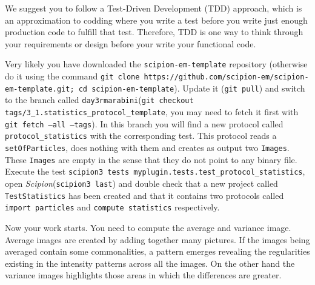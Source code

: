 \documentclass[12pt]{article} %
\def\scipion{\textit{Scipion}\xspace}
\newcommand{\ttt}[1]{\texttt{#1}}
\def\repository{\ttt{scipion-em-template}\xspace}
\def\branch{\ttt{day3rmarabini}\xspace}
\def\protocolname{\ttt{protocol\_statistics}\xspace}
\begin{document}
We suggest you to follow a Test-Driven Development (TDD) approach, which is an approximation to codding where you write a test before you write just enough production code to fulfill that test. Therefore, TDD is one way to think through your requirements or design before your write your functional code.

Very likely you have downloaded the \repository repository (otherwise do it using the command \ttt{git clone https://github.com/scipion-em/scipion-em-template.git; cd scipion-em-template}). Update it (\ttt{git pull}) and switch to the branch called \branch (\ttt{git checkout tags/3\_1.statistics\_protocol\_template}, you may need to fetch it first with \ttt{git fetch --all --tags}). In this branch you will find a new protocol called \protocolname with the corresponding test. This protocol reads a \ttt{setOfParticles}, does nothing with them and creates as output two \ttt{Images}. These \ttt{Images} are empty in the sense that they do not point to any binary file. Execute the test \ttt{scipion3 tests myplugin.tests.test\_protocol\_statistics}, open \scipion (\ttt{scipion3 last}) and double check that a new project called \ttt{TestStatistics} has been created and that it contains two protocols called \ttt{import particles} and \ttt{compute statistics} respectively.

Now your work starts. You need to compute the average and variance image. Average images are created by adding together many pictures. If the images being averaged contain some commonalities, a pattern emerges revealing the regularities existing in the intensity patterns across all the images. On the other hand the variance images highlights those areas in which the differences are greater.
\end{document}
